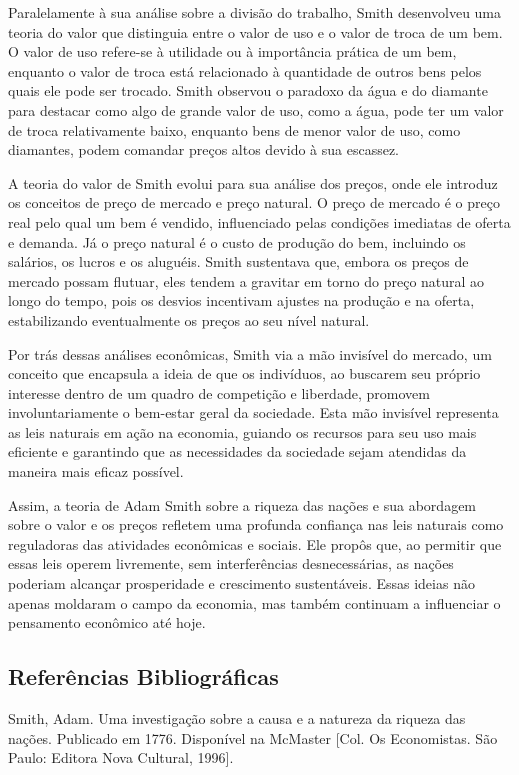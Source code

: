 \documentclass[12pt]{article}
\begin{document}
Paralelamente à sua análise sobre a divisão do trabalho, Smith desenvolveu uma teoria do valor que distinguia entre o valor de uso e o valor de troca de um bem. O valor de uso refere-se à utilidade ou à importância prática de um bem, enquanto o valor de troca está relacionado à quantidade de outros bens pelos quais ele pode ser trocado. Smith observou o paradoxo da água e do diamante para destacar como algo de grande valor de uso, como a água, pode ter um valor de troca relativamente baixo, enquanto bens de menor valor de uso, como diamantes, podem comandar preços altos devido à sua escassez.

A teoria do valor de Smith evolui para sua análise dos preços, onde ele introduz os conceitos de preço de mercado e preço natural. O preço de mercado é o preço real pelo qual um bem é vendido, influenciado pelas condições imediatas de oferta e demanda. Já o preço natural é o custo de produção do bem, incluindo os salários, os lucros e os aluguéis. Smith sustentava que, embora os preços de mercado possam flutuar, eles tendem a gravitar em torno do preço natural ao longo do tempo, pois os desvios incentivam ajustes na produção e na oferta, estabilizando eventualmente os preços ao seu nível natural.

Por trás dessas análises econômicas, Smith via a mão invisível do mercado, um conceito que encapsula a ideia de que os indivíduos, ao buscarem seu próprio interesse dentro de um quadro de competição e liberdade, promovem involuntariamente o bem-estar geral da sociedade. Esta mão invisível representa as leis naturais em ação na economia, guiando os recursos para seu uso mais eficiente e garantindo que as necessidades da sociedade sejam atendidas da maneira mais eficaz possível.

Assim, a teoria de Adam Smith sobre a riqueza das nações e sua abordagem sobre o valor e os preços refletem uma profunda confiança nas leis naturais como reguladoras das atividades econômicas e sociais. Ele propôs que, ao permitir que essas leis operem livremente, sem interferências desnecessárias, as nações poderiam alcançar prosperidade e crescimento sustentáveis. Essas ideias não apenas moldaram o campo da economia, mas também continuam a influenciar o pensamento econômico até hoje.

\subsection{\textbf{Referências Bibliográficas}}
Smith, Adam. Uma investigação sobre a causa e a natureza da riqueza das nações. Publicado
em 1776. Disponível na McMaster [Col. Os Economistas. São Paulo: Editora Nova
Cultural, 1996].
\end{document}
